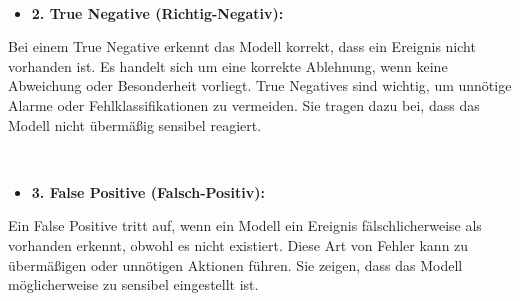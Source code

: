 \\
\begin{itemize} \item \textbf{2. True Negative (Richtig-Negativ):} \end{itemize}
Bei einem True Negative erkennt das Modell korrekt, dass ein Ereignis nicht vorhanden ist. Es handelt sich um eine korrekte Ablehnung, wenn keine Abweichung oder Besonderheit vorliegt. True Negatives sind wichtig, um unnötige Alarme oder Fehlklassifikationen zu vermeiden. Sie tragen dazu bei, dass das Modell nicht übermäßig sensibel reagiert\cite{Fehlerkategorie}.

\\
\begin{itemize} \item \textbf{3. False Positive (Falsch-Positiv):} \end{itemize}
Ein False Positive tritt auf, wenn ein Modell ein Ereignis fälschlicherweise als vorhanden erkennt, obwohl es nicht existiert. Diese Art von Fehler kann zu übermäßigen oder unnötigen Aktionen führen. Sie zeigen, dass das Modell möglicherweise zu sensibel eingestellt ist\cite{Fehlerkategorie}.


